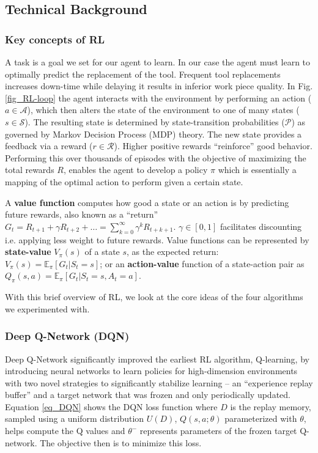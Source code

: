 \documentclass[referee, sn-mathphys-num]{sn-jnl}
\begin{document}
	\subsection{Technical Background}
	\subsubsection*{Key concepts of RL}
	A task is a goal we set for our agent to learn. In our case the agent must learn to optimally predict the replacement of the tool. Frequent tool replacements increases down-time while delaying it results in inferior work piece quality. In Fig. \ref{fig_RL-loop} the agent interacts with the environment by performing an action ($a \in \mathcal{A}$), which then alters the state of the environment to one of many states ($s \in \mathcal{S}$). The resulting state is determined by state-transition probabilities ($\mathcal{P}$) as governed by Markov Decision Process (MDP) theory. The new state provides a feedback via a reward ($r \in \mathcal{R}$). Higher positive rewards ``reinforce'' good behavior. Performing this over thousands of episodes with the objective of maximizing the total rewards $R$, enables the agent to develop a policy $\pi$ which is essentially a mapping of the optimal action to perform given a certain state.
	
	A \textbf{value function} computes how good a state or an action is by predicting future rewards, also known as a ``return'' $G_t = R_{t+1} + \gamma R_{t+2} + \dots = \sum_{k=0}^{\infty} \gamma^k R_{t+k+1}$. $\gamma \in [0, 1]$ facilitates discounting i.e. applying less weight to future rewards. Value functions can be represented by \textbf{state-value} $V_{\pi}(s)$ of a state $s$, as the expected return: $V_{\pi}(s) = \mathbb{E}_{\pi}[G_t \vert S_t = s]$; or an \textbf{action-value} function of a state-action pair as $Q_{\pi}(s, a) = \mathbb{E}_{\pi}[G_t \vert S_t = s, A_t = a]$.
	
	With this brief overview of RL, we look at the core ideas of the four algorithms we experimented with.
	
	\subsubsection*{Deep Q-Network (DQN)}
	Deep Q-Network \cite{DQN-mnih2013} significantly improved the earliest RL algorithm, Q-learning, by introducing neural networks to learn policies for high-dimension environments with two novel strategies to significantly stabilize learning -- an ``experience replay buffer'' and a target network that was frozen and only periodically updated. Equation \eqref{eq_DQN} shows the DQN loss function where $D$ is the replay memory, sampled using a uniform distribution $U(D)$, $Q(s, a; \theta)$ parameterized with $\theta$, helps compute the Q values and $\theta^{-}$ represents parameters of the frozen target Q-network. The objective then is to minimize this loss.
	
\end{document}
